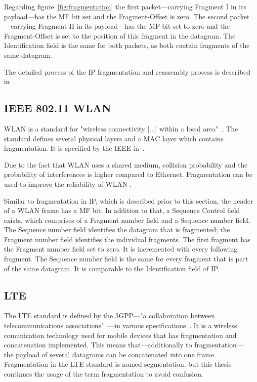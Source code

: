 Regarding figure~\ref{fig:fragmentation} the first packet---carrying Fragment I in its payload---has the \gls{MF} bit set and the Fragment-Offset is zero.
The second packet---carrying Fragment II in its payload---has the \gls{MF} bit set to zero and the Fragment-Offset is set to the position of this fragment in the datagram.
The Identification field is the same for both packets, as both contain fragments of the same datagram.

The detailed process of the \gls{IP} fragmentation and reassembly process is described in~\cite[section 2.3]{rfc791}

\subsection{\acrshort{IEEE} 802.11 \acrlong{WLAN}}
\gls{WLAN} is a standard for "wireless connectivity [...] within a local area"~\cite[sec. 1.1]{ieeewlan}.
The standard defines several physical layers and a \gls{MAC} layer which contains fragmentation.
It is specified by the \gls{IEEE} in~\cite{ieeewlan}.

Due to the fact that \gls{WLAN} uses a shared medium, collision probability and the probability of interferences is higher compared to Ethernet.
Fragmentation can be used to improve the reliability of \gls{WLAN} \cite[sec. 4.4.3]{tanenbaum2011networks}.

Similar to fragmentation in \gls{IP}, which is described prior to this section, the header of a \gls{WLAN} frame has a \gls{MF} bit.
In addition to that, a Sequence Control field exists, which comprises of a Fragment number field and a Sequence number field.
The Sequence number field identifies the datagram that is fragmented; the Fragment number field identifies the individual fragments.
The first fragment has the Fragment number field set to zero.
It is incremented with every following fragment.
The Sequence number field is the same for every fragment that is part of the same datagram.
It is comparable to the Identification field of \gls{IP}.
\pagebreak
\subsection{\acrlong{LTE}}
\label{sec:lte}
The \gls{LTE} standard is defined by the 3GPP---"a collaboration between telecommunications associations"~\cite{tanenbaum2011networks}---in various specifications~\cite{3gppr8}.
It is a wireless comunication technology used for mobile devices that has fragmentation and concatenation implemented.
This means that---additionally to fragmentation---the payload of several datagrams can be concatenated into one frame.
Fragmentation in the \gls{LTE} standard is named segmentation, but this thesis continues the usage of the term fragmentation to avoid confusion.

